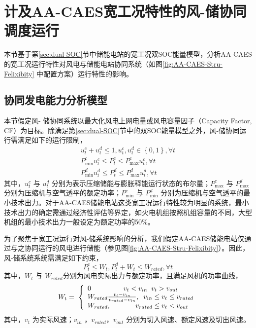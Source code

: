 \section{计及AA-CAES宽工况特性的风-储协同调度运行}
\label{sec:chap3-wind-ESS-operation}
本节基于第\ref{sec:dual-SOC}节中储能电站的宽工况双SOC能量模型，分析AA-CAES的宽工况运行特性对风电与储能电站协同系统（如图\ref{fig:AA-CAES-Stru-Felixibity} 中配置方案）运行特性的影响。

\subsection{协同发电能力分析模型}
本节假定风- 储协同系统以最大化风电上网电量或风电容量因子（Capacity Factor, CF）为目标。除满足第\ref{sec:dual-SOC}节中的双SOC能量模型之外，风-储协同运行需满足如下的运行限制，
\begin{subequations}
\label{eq:WT-CAES-Power-Limit}
\begin{gather}
u_t^c + u_t^d \le 1,u_t^c,u_t^d \in \left\{ {0,1} \right\}, \forall t\\
P_{\min }^cu_t^c \le P_t^c \le P_{\max }^cu_t^c, \forall t \\
 P_{\min }^du_t^d \le P_t^d \le P_{\max }^du_t^d, \forall t
\end{gather}
\end{subequations}
其中，$u_t^c$ 与 $u_t^d$ 分别为表示压缩储能与膨胀释能运行状态的布尔量；$P_{\max }^c$ 与 $P_{\max }^d$ 分别为压缩机与空气透平的额定功率；$P_{\min }^c$ 与 $P_{\min }^d$ 分别为压缩机与空气透平的最小技术出力。对于AA-CAES储能电站这类宽工况运行特性较为明显的系统，最小技术出力的确定需通过经济性评估等界定，如火电机组按照机组容量的不同，大型机组的最小技术出力一般设定为额定功率的50\%。

为了聚焦于宽工况运行对风-储系统影响的分析，我们假定AA-CAES储能电站仅通过与之协同运行的风电进行储能（参见图\ref{fig:AA-CAES-Stru-Felixibity}）。因此，风-储系统系统需满足如下约束，
\begin{equation}
\label{eq:WT-Power-Limit}
P_t^c \le {W_t},P_t^d + {W_t} \le {W_{rated}},\forall t
\end{equation}
其中，$W_t$ 与 $W_{rated}$分别为风电实际出力与额定功率，且满足风机的功率曲线，
\begin{equation}
\label{eq:WT-Power-Curve}
{W_t} = \;\left\{ \begin{array}{l}
{\rm{0}}\;\;\;\;\;\;\;\;\;\;\;\;\;\;\;\;\;{v_t} < {v_{in}}\;\;{v_t} > {v_{out}}\\
{W_{rated}}\frac{{{v_t} - {v_{in}}}}{{{v_{rated}} - {v_{in}}}},\;\;{v_{in}} \le {v_t} \le {v_{rated}}\\
{W_{rated}},\;\;\;\;\;\;\;\;\;\;\;\;\;{v_{rated}} \le {v_t} < {v_{out}}
\end{array} \right.
\end{equation}
其中，$v_t$ 为实际风速；$v_{in}$ ，$v_{rated}$，$v_{out}$ 分别为切入风速、额定风速及切出风速。

